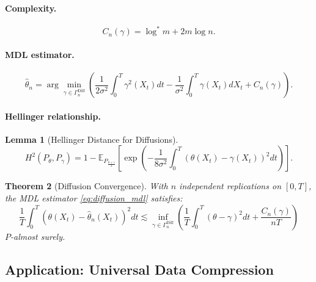 \documentclass[preprint,review,12pt]{article}
\newtheorem{theorem}{Theorem}[section]
\newtheorem{lemma}[theorem]{Lemma}
\begin{document}
\paragraph{Complexity.}
\begin{equation}\label{eq:diffusion_complexity}
C_n(\gamma) = \log^* m + 2m \log n.
\end{equation}

\paragraph{MDL estimator.}
\begin{equation}\label{eq:diffusion_mdl}
\hat{\theta}_n = \arg\min_{\gamma \in \Gamma_n^{\text{Diff}}} \left( 
\frac{1}{2\sigma^2} \int_0^T \gamma^2(X_t) dt 
- \frac{1}{\sigma^2} \int_0^T \gamma(X_t) dX_t + C_n(\gamma) \right).
\end{equation}

\paragraph{Hellinger relationship.}

\begin{lemma}[Hellinger Distance for Diffusions]\label{lem:diffusion_hellinger}
\begin{equation}\label{eq:diffusion_hellinger}
	H^2(P_\theta, P_\gamma) = 1 - \mathbb{E}_{P_{\frac{\theta+\gamma}{2}}}\left[ 
	\exp\left( -\frac{1}{8\sigma^2} \int_0^T (\theta(X_t) - \gamma(X_t))^2 dt 
	\right) \right].
\end{equation}
\end{lemma}

\begin{theorem}[Diffusion Convergence]\label{thm:diffusion}
With $n$ independent replications on $[0, T]$, the MDL estimator 
\eqref{eq:diffusion_mdl} satisfies:
\begin{equation}\label{eq:diffusion_rate}
	\frac{1}{T} \int_0^T (\theta(X_t) - \hat{\theta}_n(X_t))^2 dt 
	\lesssim \inf_{\gamma \in \Gamma_n^{\text{Diff}}} \left( 
	\frac{1}{T} \int_0^T (\theta - \gamma)^2 dt + \frac{C_n(\gamma)}{nT} \right)
\end{equation}
$P$-almost surely.
\end{theorem}

\subsection{Application: Universal Data Compression}
\label{subsec:compression}
\end{document}
